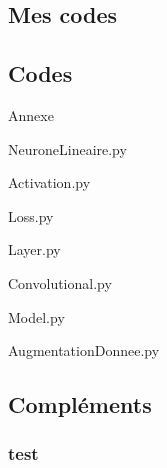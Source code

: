 \subsection{Mes codes}

\subsection{Codes}
\begin{frame}{Annexe}
    
\end{frame}


\begin{frame}{NeuroneLineaire.py}
    
\end{frame}


\begin{frame}{Activation.py}
    
\end{frame}


\begin{frame}{Loss.py}
    
\end{frame}


\begin{frame}{Layer.py}
    
\end{frame}


\begin{frame}{Convolutional.py}
    

\end{frame}


\begin{frame}{Model.py}
    
\end{frame}


\begin{frame}{AugmentationDonnee.py}
    
\end{frame}


\subsection*{Compléments}
\begin{frame}
    \frametitle{test}
\end{frame}

